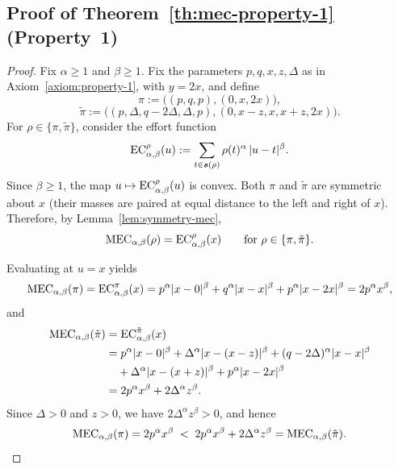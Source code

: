 \subsection{Proof of Theorem~\ref{th:mec-property-1} (Property~1)}
\label{appendix:proof-mec-property-1}

\mecPropertyOne*
\begin{proof}
Fix $\alpha\ge 1$ and $\beta\ge 1$. Fix the parameters $p,q,x,z,\Delta$ as in Axiom~\ref{axiom:property-1}, with $y=2x$, and define
\[
\pi := \big((p,q,p),(0,x,2x)\big),
\]
\[
\tilde{\pi} := \big((p,\Delta,q-2\Delta,\Delta,p),(0,x-z,x,x+z,2x)\big).
\]
For $\rho\in\{\pi,\tilde{\pi}\}$, consider the effort function
\[
\EC[\alpha,\beta][\rho](u):=\sum_{t\in \support(\rho)} \rho(t)^\alpha\,|u-t|^\beta.
\]
Since $\beta\ge1$, the map $u\mapsto \EC[\alpha,\beta][\rho](u)$ is convex. Both $\pi$ and $\tilde{\pi}$ are symmetric about $x$ (their masses are paired at equal distance to the left and right of $x$). Therefore, by Lemma~\ref{lem:symmetry-mec},
\[
\MEC(\rho)=\EC[\alpha,\beta][\rho](x)\qquad\text{for }\rho\in\{\pi,\tilde{\pi}\}.
\]

Evaluating at $u=x$ yields
\[
\MEC(\pi)=\EC[\alpha,\beta][\pi](x)
=p^\alpha|x-0|^\beta+q^\alpha|x-x|^\beta+p^\alpha|x-2x|^\beta
=2p^\alpha x^\beta,
\]
and
\begin{align*}
\MEC(\tilde{\pi})
&=\EC[\alpha,\beta][\tilde{\pi}](x) \\
&=p^\alpha|x-0|^\beta+\Delta^\alpha|x-(x-z)|^\beta+(q-2\Delta)^\alpha|x-x|^\beta \\
&\quad +\Delta^\alpha|x-(x+z)|^\beta+p^\alpha|x-2x|^\beta \\
&=2p^\alpha x^\beta+2\Delta^\alpha z^\beta.
\end{align*}
Since $\Delta>0$ and $z>0$, we have $2\Delta^\alpha z^\beta>0$, and hence
\[
\MEC(\pi)=2p^\alpha x^\beta \;<\; 2p^\alpha x^\beta+2\Delta^\alpha z^\beta=\MEC(\tilde{\pi}).
\]
\end{proof}
